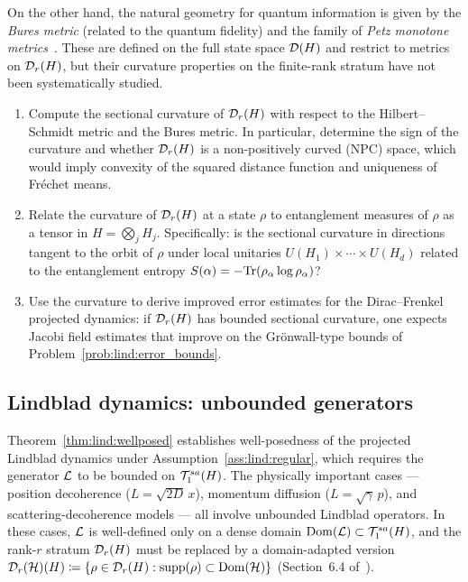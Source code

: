 On the other hand, the natural geometry for quantum information is given
by the \emph{Bures metric} (related to the quantum fidelity) and the
family of \emph{Petz monotone metrics}~\cite{BratteliRobinson1987}.
These are defined on the full state space $\mathcal{D}(H)$ and restrict to
metrics on $\mathcal{D}_{r}(H)$, but their curvature properties on the finite-rank
stratum have not been systematically studied.

\begin{problem}
\label{prob:curvature_entanglement}
\begin{enumerate}
\item[\textup{(a)}] Compute the sectional curvature of $\mathcal{D}_{r}(H)$
    with respect to the Hilbert--Schmidt metric and the Bures metric.
    In particular, determine the sign of the curvature and whether
    $\mathcal{D}_{r}(H)$ is a non-positively curved (NPC) space, which
    would imply convexity of the squared distance function and
    uniqueness of Fréchet means.
\item[\textup{(b)}] Relate the curvature of $\mathcal{D}_{r}(H)$ at a state
    $\rho$ to entanglement measures of $\rho$ as a tensor in
    $H = \bigotimes_j H_j$. Specifically: is the sectional curvature
    in directions tangent to the orbit of $\rho$ under local unitaries
    $U(H_1) \times \cdots \times U(H_d)$ related to the entanglement
    entropy $S(\alpha) = -\mathrm{Tr}(\rho_\alpha \log \rho_\alpha)$?
\item[\textup{(c)}] Use the curvature to derive improved error estimates
    for the Dirac--Frenkel projected dynamics: if $\mathcal{D}_{r}(H)$
    has bounded sectional curvature, one expects Jacobi field estimates
    that improve on the Grönwall-type bounds of
    Problem~\ref{prob:lind:error_bounds}.
\end{enumerate}
\end{problem}

\subsection*{Lindblad dynamics: unbounded generators}

Theorem~\ref{thm:lind:wellposed} establishes well-posedness of the
projected Lindblad dynamics under Assumption~\ref{ass:lind:regular},
which requires the generator $\mathcal{L}$ to be bounded on $\mathcal{T}_{1}^{sa}(H)$.
The physically important cases — position decoherence ($L = \sqrt{2D}\,x$),
momentum diffusion ($L = \sqrt{\gamma}\,p$), and scattering-decoherence
models — all involve unbounded Lindblad operators. In these cases,
$\mathcal{L}$ is well-defined only on a dense domain $\mathrm{Dom}(\mathcal{L}) \subset
\mathcal{T}_{1}^{sa}(H)$, and the rank-$r$ stratum $\mathcal{D}_{r}(H)$ must be replaced
by a domain-adapted version
$\mathcal{D}_{r}(\mathcal{H})(H) \coloneqq \{\rho \in \mathcal{D}_{r}(H) : \mathrm{supp}(\rho) \subset
\mathrm{Dom}(\mathcal{H})\}$ (Section~6.4 of~\cite{AcevedoFalco2026}).

